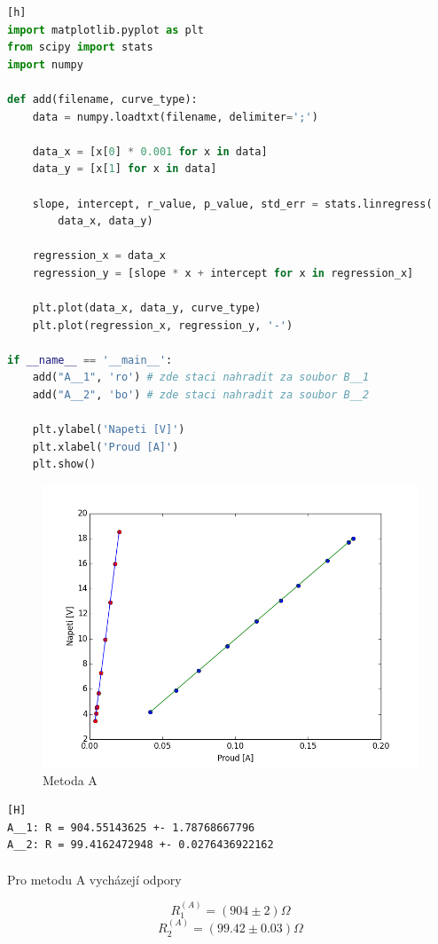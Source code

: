 \documentclass[a4paper,11pt]{article}
\begin{document}
\begin{lstlisting}[language=Python][h]
import matplotlib.pyplot as plt
from scipy import stats
import numpy

def add(filename, curve_type):
    data = numpy.loadtxt(filename, delimiter=';')

    data_x = [x[0] * 0.001 for x in data]
    data_y = [x[1] for x in data]

    slope, intercept, r_value, p_value, std_err = stats.linregress(
        data_x, data_y)

    regression_x = data_x
    regression_y = [slope * x + intercept for x in regression_x]

    plt.plot(data_x, data_y, curve_type)
    plt.plot(regression_x, regression_y, '-')

if __name__ == '__main__':
    add("A__1", 'ro') # zde staci nahradit za soubor B__1
    add("A__2", 'bo') # zde staci nahradit za soubor B__2

    plt.ylabel('Napeti [V]')
    plt.xlabel('Proud [A]')
    plt.show()\end{lstlisting} 

    \begin{figure}[H]
        \centering
        \includegraphics[width=0.6\linewidth]{A.png}
        \caption{Metoda A}
    \end{figure}

\begin{lstlisting}[language=Bash][H]
A__1: R = 904.55143625 +- 1.78768667796
A__2: R = 99.4162472948 +- 0.0276436922162\end{lstlisting}

    \paragraph{} Pro metodu A vycházejí odpory

    \begin{equation}
        R^{(A)}_{1} = (904 \pm 2) \Omega
    \end{equation}
    \begin{equation}
        R^{(A)}_{2} = (99.42 \pm 0.03) \Omega
    \end{equation}
\end{document}
